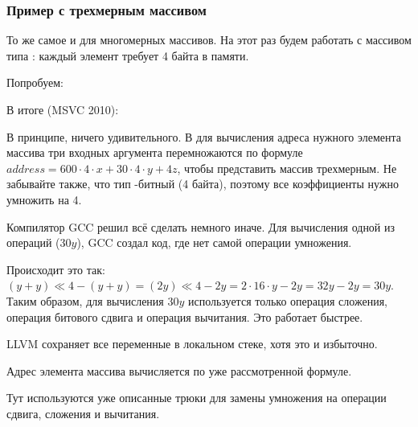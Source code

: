 \subsubsection{Пример с трехмерным массивом}

То же самое и для многомерных массивов.
На этот раз будем работать с массивом типа \Tint: каждый элемент требует 4 байта в памяти.

Попробуем:




В итоге (MSVC 2010):



В принципе, ничего удивительного. В  для вычисления адреса нужного элемента массива 
три входных аргумента перемножаются по формуле $address=600 \cdot 4 \cdot x + 30 \cdot 4 \cdot y + 4z$, 
чтобы представить массив трехмерным.
Не забывайте также, что тип -битный (4 байта), поэтому все коэффициенты нужно умножить на 4.



Компилятор GCC решил всё сделать немного иначе.
Для вычисления одной из операций ($30y$), GCC создал код, где нет самой операции умножения.

Происходит это так: 
$(y+y) \ll 4 - (y+y) = (2y) \ll 4 - 2y = 2 \cdot 16 \cdot y - 2y = 32y - 2y = 30y$. 
Таким образом, для вычисления $30y$ используется только операция сложения, 
операция битового сдвига и операция вычитания.
Это работает быстрее.




\NonOptimizing LLVM сохраняет все переменные в локальном стеке, хотя это и избыточно.

Адрес элемента массива вычисляется по уже рассмотренной формуле.




Тут используются уже описанные трюки для замены умножения на операции сдвига, сложения и вычитания.

